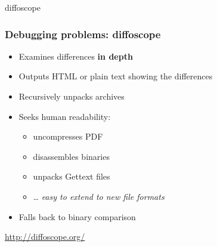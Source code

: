 \documentclass[14pt]{beamer}
\begin{document}
{
\begin{frame}{diffoscope}
 \frametitle{Debugging problems: diffoscope}

 \begin{itemize}
  \item Examines differences \textbf{in depth}
  \item Outputs HTML or plain text showing the differences
  \item Recursively unpacks archives
  \item Seeks human readability:
   \begin{itemize}
    \item uncompresses PDF
    \item disassembles binaries
    \item unpacks Gettext files
    \item … \textit{easy to extend to new file formats}
   \end{itemize}
  \item Falls back to binary comparison
 \end{itemize}
 \vfill
 \begin{center}
  \url{http://diffoscope.org/}\\
  {\footnotesize {}}
 \end{center}
\end{frame}
}
\end{document}
